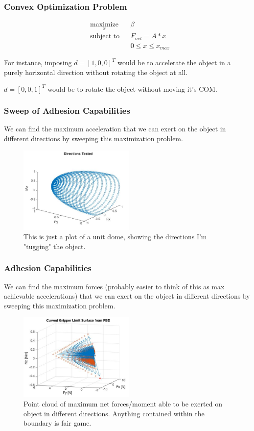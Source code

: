 \documentclass{beamer}
\begin{document}
\frame
{
\frametitle{ Convex Optimization Problem }

	
\begin{equation*}
	\begin{aligned}
	& \underset{x}{\text{maximize}}
	& & \beta \\
	& \text{subject to}
	& & F_{net} = A * x \\
	&
	& & 0 \leq x \leq x_{max}
	\end{aligned}
\end{equation*}

For instance, imposing $d = [1, 0, 0]^{T}$ would be to accelerate the object in a purely horizontal direction without rotating the object at all. 

$d = [0, 0, 1]^{T}$ would be to rotate the object without moving it's COM. 
	
}


\frame
{
\frametitle{ Sweep of Adhesion Capabilities }

We can find the maximum acceleration that we can exert on the object in different directions by sweeping this maximization problem. 

\begin{figure}[htb]
	\centering
	\includegraphics[width=2.25in]{images/directions.jpg}
	\caption{This is just a plot of a unit dome, showing the directions I'm "tugging" the object.}
	\label{fig:directions}
\end{figure}
	
}


\frame
{
\frametitle{ Adhesion Capabilities }

We can find the maximum forces (probably easier to think of this as max achievable accelerations) that we can exert on the object in different directions by sweeping this maximization problem. 

\begin{figure}[htb]
	\centering
	\includegraphics[width=2.25in]{images/CurvedGripperFBDSurfaceLimit.jpg}
	\caption{Point cloud of maximum net forces/moment able to be exerted on object in different directions. Anything contained within the boundary is fair game.}
\end{figure}
	
}
\end{document}
